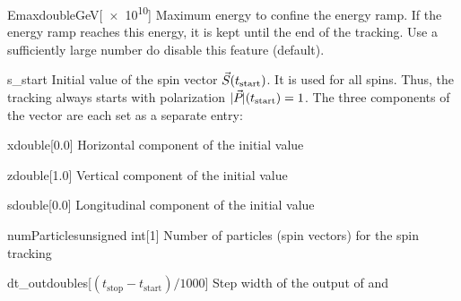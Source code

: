 \documentclass[a4paper]{scrartcl}
\begin{document}
\begin{configdoc}{Emax}{double}{\si{\GeV}}[\num{e10}]
  Maximum energy to confine the energy ramp.
  If the energy ramp reaches this energy, it is kept until the end of the tracking. Use a
  sufficiently large number do disable this feature (default).
\end{configdoc}

\begin{configdocgroup}{s_start}
  Initial value of the spin vector $\vec{S}_{}(t_\text{start})$. It is used for all spins.
  Thus, the tracking always starts with polarization $|\vec{P}_{}|(t_\text{start}) = 1$. The
  three components of the vector are each set as a separate entry:
  
  \begin{configdoc}{x}{double}{}[0.0]
    Horizontal component \sx of the initial value
  \end{configdoc}

  \begin{configdoc}{z}{double}{}[1.0]
    Vertical component \sz of the initial value
  \end{configdoc}

  \begin{configdoc}{s}{double}{}[0.0]
    Longitudinal component \slong of the initial value
  \end{configdoc}
\end{configdocgroup}

\begin{configdoc}{numParticles}{unsigned int}{}[1]
  Number of particles (spin vectors) for the spin tracking
\end{configdoc}

\begin{configdoc}{dt_out}{double}{\si{\s}}[$(t_\text{stop}-t_\text{start})/1000$]
  Step width of the output of \pvec and \svec[i]
\end{configdoc}
\end{document}
